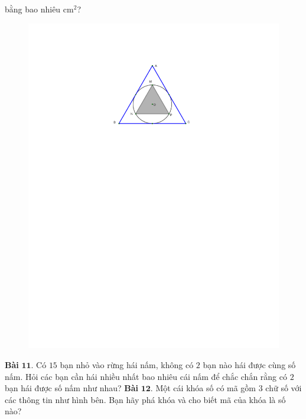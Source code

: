 \begin{multicols}{2}
	bằng bao nhiêu cm$^2$?
	\begin{figure}[H]
		\vspace*{-5pt}
		\centering
		\captionsetup{labelformat= empty, justification=centering}
		\includegraphics[width= 0.7\linewidth]{bai10k2}
		\vspace*{-10pt}
	\end{figure}
	\textbf{\color{toancuabi}Bài} $\pmb{11.}$ Có $15$ bạn nhỏ vào rừng hái nấm, không có $2$ bạn nào hái được cùng số nấm. Hỏi các bạn cần hái nhiều nhất bao nhiêu cái nấm để chắc chắn rằng có $2$ bạn hái được số nấm như nhau?
	\vskip 0.1cm
	\textbf{\color{toancuabi}Bài} $\pmb{12.}$ Một cái khóa số có mã gồm $3$ chữ số với các thông tin như hình bên. Bạn hãy phá khóa và cho biết mã của khóa là số nào?
	\begin{figure}[H]
		\vspace*{-5pt}
		\centering
		\captionsetup{labelformat= empty, justification=centering}

\end{figure}
\end{multicols}
